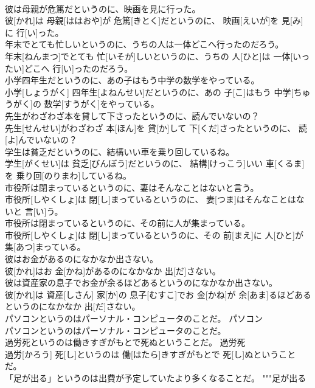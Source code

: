 \documentclass[8pt]{extreport}
\begin{document}
\begin{CJK}{UTF8}{min}
\\	彼は母親が危篤だというのに、映画を見に行った。	
\\	彼[かれ]は 母親[ははおや]が 危篤[きとく]だというのに、 映画[えいが]を 見[み]に 行[い]った。
\\	年末でとても忙しいというのに、うちの人は一体どこへ行ったのだろう。	
\\	年末[ねんまつ]でとても 忙[いそが]しいというのに、うちの 人[ひと]は 一体[いったい]どこへ 行[い]ったのだろう。
\\	小学四年生だというのに、あの子はもう中学の数学をやっている。	
\\	小学[しょうがく] 四年生[よねんせい]だというのに、あの 子[こ]はもう 中学[ちゅうがく]の 数学[すうがく]をやっている。
\\	先生がわざわざ本を貸して下さったというのに、読んでいないの？	
\\	先生[せんせい]がわざわざ 本[ほん]を 貸[か]して 下[くだ]さったというのに、 読[よ]んでいないの？
\\	学生は貧乏だというのに、結構いい車を乗り回しているね。	
\\	学生[がくせい]は 貧乏[びんぼう]だというのに、 結構[けっこう]いい 車[くるま]を 乗り回[のりまわ]しているね。
\\	市役所は閉まっているというのに、妻はそんなことはないと言う。	
\\	市役所[しやくしょ]は 閉[し]まっているというのに、 妻[つま]はそんなことはないと 言[い]う。
\\	市役所は閉まっているというのに、その前に人が集まっている。	
\\	市役所[しやくしょ]は 閉[し]まっているというのに、その 前[まえ]に 人[ひと]が 集[あつ]まっている。
\\	彼はお金があるのになかなか出さない。	
\\	彼[かれ]はお 金[かね]があるのになかなか 出[だ]さない。
\\	彼は資産家の息子でお金が余るほどあるというのになかなか出さない。	
\\	彼[かれ]は 資産[しさん] 家[か]の 息子[むすこ]でお 金[かね]が 余[あま]るほどあるというのになかなか 出[だ]さない。
\\	パソコンというのはパーソナル・コンピュータのことだ。	パソコン 
\\	パソコンというのはパーソナル・コンピュータのことだ。
\\	過労死というのは働きすぎがもとで死ぬということだ。	過労死 
\\	過労[かろう] 死[し]というのは 働[はたら]きすぎがもとで 死[し]ぬということだ。
\\	「足が出る」というのは出費が予定していたより多くなることだ。	"""足が出る

\end{CJK}
\end{document}
